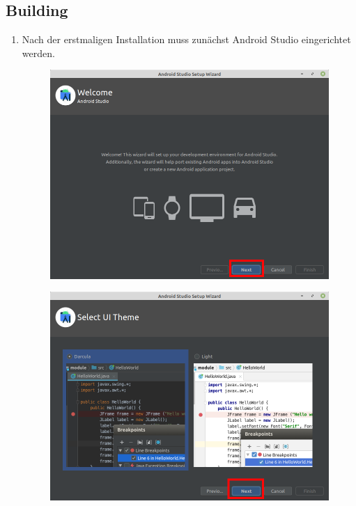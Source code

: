 \documentclass{article}
\begin{document}
\subsection{Building}
\begin{enumerate}
    \item Nach der erstmaligen Installation muss zunächst Android Studio eingerichtet werden.

        \begin{minipage}{0.5\textwidth}
        \begin{figure}[H]
            \includegraphics[scale=0.27]{1.png}
        \end{figure}
        \begin{figure}[H]
            \includegraphics[scale=0.27]{3.png}

\end{figure}
\end{minipage}
\end{enumerate}
\end{document}
